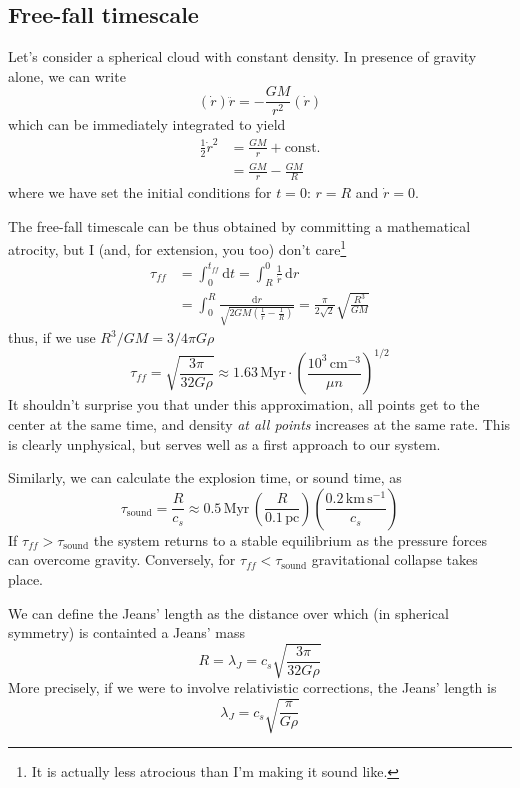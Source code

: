 \subsection{Free-fall timescale}
Let's consider a spherical cloud with constant density. In presence of gravity alone, we can write 
\begin{equation*}
    (\dot{r})\ddot{r} = -\frac{GM}{r^{2}}(\dot{r})
\end{equation*}
which can be immediately integrated to yield 
\begin{align*}
    \frac{1}{2}\dot{r}^{2} &= \frac{GM}{r}+\text{const.}\\
    &= \frac{GM}{r}-\frac{GM}{R}
\end{align*}
where we have set the initial conditions for $t=0$: $r=R$ and $\dot{r} = 0$.
\par The free-fall timescale can be thus obtained by committing a mathematical atrocity, but I (and, for extension, you too) don't care\footnote{It is actually less atrocious than I'm making it sound like.}
\begin{align*}
    \tau_{ff} &= \int_{0}^{t_{ff}} \text{d}t = \int_{R}^{0}\frac{1}{\dot{r}}\,\text{d}r \\
    &= \int_{0}^{R} \frac{\text{d}r}{\sqrt{2GM\left(\frac{1}{r}-\frac{1}{R}\right)}} = \frac{\pi}{2\sqrt{2}}\sqrt{\frac{R^{3}}{GM}}
\end{align*}
thus, if we use $R^{3}/GM = 3/4\pi G\rho$
\begin{equation}
    \tau_{ff} = \sqrt{\frac{3\pi}{32G\rho}} \approx 1.63\,\text{Myr}\cdot\left(\frac{10^{3}\,\text{cm}^{-3}}{\mu n}\right)^{1/2}
    \label{eq:ff_timescale}
\end{equation}
It shouldn't surprise you that under this approximation, all points get to the center at the same time, and density \emph{at all points} increases at the same rate. This is clearly unphysical, but serves well as a first approach to our system.
\par Similarly, we can calculate the explosion time, or sound time, as 
\begin{equation}
    \tau_{\text{sound}} = \frac{R}{c_{s}} \approx 0.5\,\text{Myr}\,\left(\frac{R}{0.1\,\text{pc}}\right)\left(\frac{0.2\,\text{km}\,\text{s}^{-1}}{c_{s}}\right)
    \label{eq:sound_time}
\end{equation}
If $\tau_{ff}>\tau_{\text{sound}}$ the system returns to a stable equilibrium as the pressure forces can overcome gravity. Conversely, for $\tau_{ff}<\tau_{\text{sound}}$ gravitational collapse takes place.
\par We can define the Jeans' length as the distance over which (in spherical symmetry) is containted a Jeans' mass 
\begin{equation*}
    R = \lambda_{J} = c_{s}\sqrt{\frac{3\pi}{32G\rho}}
\end{equation*}
More precisely, if we were to involve relativistic corrections, the Jeans' length is 
\begin{equation*}
    \lambda_{J} =  c_{s}\sqrt{\frac{\pi}{G\rho}}
\end{equation*}
